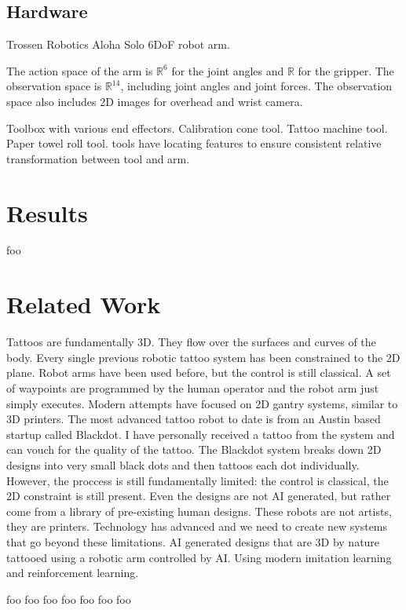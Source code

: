 \documentclass[11pt]{article}
\begin{document}
\subsection{Hardware}

Trossen Robotics Aloha Solo 6DoF robot arm.

The action space of the arm is $\mathbb{R}^6$ for the joint angles and $\mathbb{R}$ for the gripper.
The observation space is $\mathbb{R}^{14}$, including joint angles and joint forces.
The observation space also includes 2D images for overhead and wrist camera.

Toolbox with various end effectors.
Calibration cone tool.
Tattoo machine tool.
Paper towel roll tool.
tools have locating features to ensure consistent relative transformation between tool and arm.

\section{Results}

foo

\section{Related Work}

Tattoos are fundamentally 3D. They flow over the surfaces and curves of the body. Every single previous robotic tattoo system has been constrained to the 2D plane.
Robot arms have been used before, but the control is still classical.
A set of waypoints are programmed by the human operator and the robot arm just simply executes.
Modern attempts have focused on 2D gantry systems, similar to 3D printers.
The most advanced tattoo robot to date is from an Austin based startup called Blackdot.
I have personally received a tattoo from the system and can vouch for the quality of the tattoo.
The Blackdot system breaks down 2D designs into very small black dots and then tattoos each dot individually.
However, the proccess is still fundamentally limited: the control is classical, the 2D constraint is still present.
Even the designs are not AI generated, but rather come from a library of pre-existing human designs.
These robots are not artists, they are printers.
Technology has advanced and we need to create new systems that go beyond these limitations.
AI generated designs that are 3D by nature tattooed using a robotic arm controlled by AI.
Using modern imitation learning and reinforcement learning.

foo \cite{NietoBastida2023}
foo \cite{arar2025swiftsketch}
foo \cite{carlier2020deepsvg}
foo \cite{mellor2020unsupervised}
foo \cite{ha2017neural}
foo \cite{huang2019learning}
foo \cite{kotani2019teaching}
\end{document}
